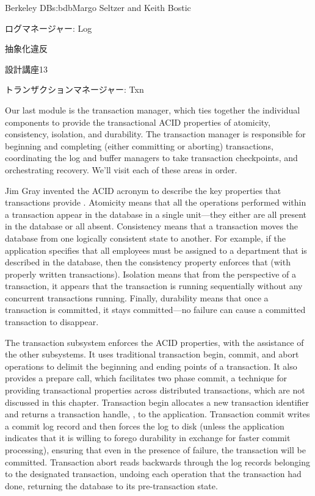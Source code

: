 \begin{aosachapter}{Berkeley DB}{s:bdb}{Margo Seltzer and Keith Bostic}
\begin{aosasect1}{ログマネージャー: Log}
\begin{aosasect2}{抽象化違反}
\begin{aosabox}{設計講座13}
\end{aosabox}

\end{aosasect2}

\end{aosasect1}

\begin{aosasect1}{トランザクションマネージャー: Txn}

Our last module is the transaction manager, which ties together the
individual components to provide the transactional ACID properties of
atomicity, consistency, isolation, and durability. The transaction
manager is responsible for beginning and completing (either committing
or aborting) transactions, coordinating the log and buffer managers to
take transaction checkpoints, and orchestrating recovery. We'll visit
each of these areas in order.


Jim Gray invented the ACID acronym to
describe the key properties that transactions provide \cite{bib:gray:trans}.  Atomicity
means that all the operations performed within a transaction appear in
the database in a single unit---they either are all present in the
database or all absent. Consistency means that a transaction moves the
database from one logically consistent state to another. For example,
if the application specifies that all employees must be assigned to a
department that is described in the database, then the consistency
property enforces that (with properly written transactions). Isolation
means that from the perspective of a transaction, it appears that the
transaction is running sequentially without any concurrent
transactions running. Finally, durability means that once a
transaction is committed, it stays committed---no failure can cause a
committed transaction to disappear.

The transaction subsystem enforces the ACID properties, with the
assistance of the other subsystems. It uses traditional transaction
begin, commit, and abort operations to delimit the beginning and
ending points of a transaction. It also provides a prepare call, which
facilitates two phase commit, a technique for providing transactional
properties across distributed transactions, which are not discussed in
this chapter. Transaction begin allocates a new transaction identifier
and returns a transaction handle, , to the application.
Transaction commit writes a commit log record and then forces the log
to disk (unless the application indicates that it is willing to forego
durability in exchange for faster commit processing), ensuring that
even in the presence of failure, the transaction will be
committed. Transaction abort reads backwards through the log records
belonging to the designated transaction, undoing each operation that
the transaction had done, returning the database to its
pre-transaction state.


\end{aosasect1}
\end{aosachapter}
